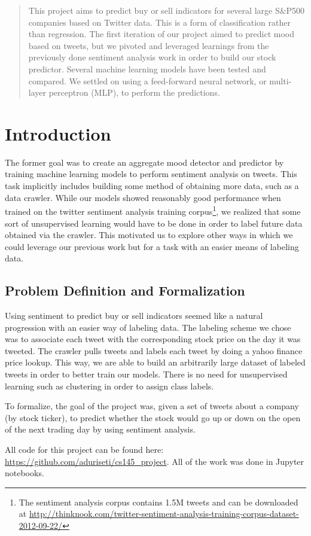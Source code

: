 \documentclass{sig-alternate-05-2015}
\begin{document}
\maketitle

	\maketitle
	\begin{abstract}
		This project aims to predict buy or sell indicators for several large S\&P500 companies based on Twitter data. This is a form of classification rather than regression. The first iteration of our project aimed to predict mood based on tweets, but we pivoted and leveraged learnings from the previously done sentiment analysis work in order to build our stock predictor. Several machine learning models have been tested and compared. We settled on using a feed-forward neural network, or multi-layer perceptron (MLP), to perform the predictions.  
	\end{abstract}
	
	
	\section{Introduction}
	The former goal was to create an aggregate mood detector and predictor by training machine learning models to perform sentiment analysis on tweets. This task implicitly includes building some method of obtaining more data, such as a data crawler. While our models showed reasonably good performance when trained on the twitter sentiment analysis training corpus\footnote{The sentiment analysis corpus contains 1.5M tweets and can be downloaded at \url{http://thinknook.com/twitter-sentiment-analysis-training-corpus-dataset-2012-09-22/}}, we realized that some sort of unsupervised learning would have to be done in order to label future data obtained via the crawler. This motivated us to explore other ways in which we could leverage our previous work but for a task with an easier means of labeling data.
	\subsection{Problem Definition and Formalization}
	Using sentiment to predict buy or sell indicators seemed like a natural progression with an easier way of labeling data. The labeling scheme we chose was to associate each tweet with the corresponding stock price on the day it was tweeted. The crawler pulls tweets and labels each tweet by doing a yahoo finance price lookup. This way, we are able to build an arbitrarily large dataset of labeled tweets in order to better train our models. There is no need for unsupervised learning such as clustering in order to assign class labels.
	\par
	To formalize, the goal of the project was, given a set of tweets about a company (by stock ticker), to predict whether the stock would go up or down on the open of the next trading day by using sentiment analysis.
	\par
	All code for this project can be found here: \url{https://github.com/aduriseti/cs145_project}. All of the work was done in Jupyter notebooks.
\end{document}
